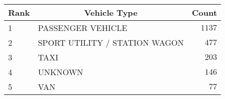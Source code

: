 \begin{table}[!tbp]
\begin{center}
\begin{tabular}{llr}
\hline\hline
\multicolumn{1}{l}{Rank}&\multicolumn{1}{c}{Vehicle Type}&\multicolumn{1}{c}{Count}\tabularnewline
\hline
1&PASSENGER VEHICLE&$1137$\tabularnewline
2&SPORT UTILITY / STATION WAGON&$ 477$\tabularnewline
3&TAXI&$ 203$\tabularnewline
4&UNKNOWN&$ 146$\tabularnewline
5&VAN&$  77$\tabularnewline
\hline
\end{tabular}\end{center}
\end{table}

